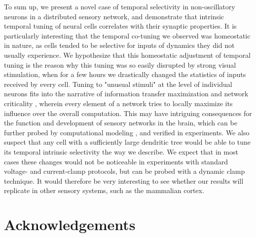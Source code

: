 \documentclass{article}
\begin{document}

To sum up, we present a novel case of temporal selectivity in non-oscillatory neurons in a distributed sensory network, and demonstrate that intrinsic temporal tuning of neural cells correlates with their synaptic properties. It is particularly interesting that the temporal co-tuning we observed was homeostatic in nature, as cells tended to be selective for inputs of dynamics they did not usually experience. We hypothesize that this homeostatic adjustment of temporal tuning is the reason why this tuning was so easily disrupted by strong visual stimulation, when for a few hours we drastically changed the statistics of inputs received by every cell. Tuning to "unusual stimuli" at the level of individual neurons fits into the narrative of information transfer maximization \citep{brenner2000} and network criticality \citep{rubinov2011}, wherein every element of a network tries to locally maximize its influence over the overall computation. This may have intriguing consequences for the function and development of sensory networks in the brain, which can be further probed by computational modeling \citep{khakhalin2014,jang2016}, and verified in experiments. We also suspect that any cell with a sufficiently large dendritic tree would be able to tune its temporal intrinsic selectivity the way we describe. We expect that in most cases these changes would not be noticeable in experiments with standard voltage- and current-clamp protocols, but can be probed with a dynamic clamp technique. It would therefore be very interesting to see whether our results will replicate in other sensory systems, such as the mammalian cortex.


\section*{Acknowledgements}
\end{document}
